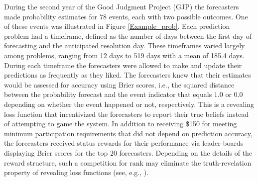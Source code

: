 \documentclass[11pt]{article}
\theoremstyle{definition}
\theoremstyle{definition}
\begin{document}
% 
During the second year of the Good Judgment Project (GJP) the forecasters made probability estimates for $78$ events, each with two possible outcomes. One of these events was illustrated in Figure \ref{Example_prob}. %
Each prediction problem had a timeframe, defined as the number of days between the first day of forecasting and the anticipated resolution day. 
These timeframes varied largely among problems, ranging from 12 days to 519 days with a mean of 185.4 days.
% 
During each timeframe the forecasters were allowed to make and update their predictions as frequently as they liked.  The forecasters knew that their estimates would be assessed for accuracy using Brier scores, i.e., the squared distance between the probability forecast and the event indicator that equals $1.0$ or $0.0$ depending on whether the event happened or not, respectively. This is a revealing loss function that incentivized the forecasters to report their true beliefs instead of attempting to game the system. In addition to receiving \$150 for meeting minimum participation requirements that did not depend on prediction accuracy, the forecasters received status rewards for their performance via leader-boards displaying Brier scores for the top $20$ forecasters. Depending on the details of the reward structure, such a competition for rank may eliminate the truth-revelation property of revealing loss functions (see, e.g., \citealt{lichtendahl2007probability}).


\end{document}
